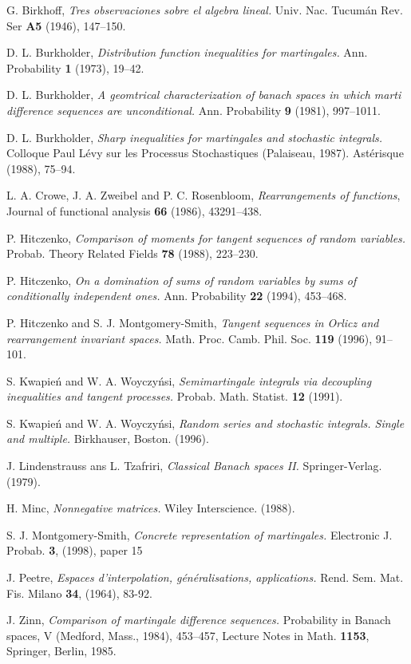 \documentclass[12pt]{amsart}
\begin{document}

\begin{thebibliography}{10}
 G. Birkhoff, \textit{Tres observaciones sobre el
algebra lineal.} Univ. Nac. Tucum\'{a}n Rev. Ser \textbf{A5}
(1946), 147--150.

 D. L. Burkholder, \textit{Distribution function inequalities for martingales.} Ann.
Probability \textbf{1} (1973), 19--42.

 D. L. Burkholder, \textit{A geomtrical characterization of banach spaces in which
marti difference sequences are unconditional.} Ann. Probability
\textbf{9} (1981), 997--1011.

 D. L. Burkholder, \textit{Sharp inequalities for martingales and stochastic integrals.}
Colloque Paul L\'{e}vy sur les Processus Stochastiques (Palaiseau,
1987). Ast\'{e}risque (1988), 75--94.

 L. A. Crowe, J. A. Zweibel and P. C. Rosenbloom, \textit{Rearrangements of functions},
Journal of functional analysis \textbf{66} (1986), 43291--438.

 P. Hitczenko, \textit{Comparison of moments for tangent sequences of random variables.}
Probab. Theory Related Fields \textbf{78} (1988), 223--230.

 P. Hitczenko, \textit{On a domination of sums of random variables by sums of conditionally
independent ones.} Ann. Probability \textbf{22} (1994), 453--468.

 P. Hitczenko and S. J. Montgomery-Smith, \textit{Tangent sequences in Orlicz and
rearrangement invariant spaces.} Math. Proc. Camb. Phil. Soc.
\textbf{119} (1996), 91--101.

 S. Kwapie\'n and W. A. Woyczy\'{n}si, \textit{Semimartingale integrals
via decoupling inequalities and tangent processes.} Probab. Math.
Statist. \textbf{12} (1991).

 S. Kwapie\'n and W. A. Woyczy\'{n}si, \textit{Random series and stochastic integrals. Single and
 multiple.} Birkhauser, Boston. (1996).

 J. Lindenstrauss ans L. Tzafriri,
\textit{Classical Banach spaces II.} Springer-Verlag. (1979).

 H. Minc, \textit{Nonnegative matrices.} Wiley Interscience. (1988).

 S. J. Montgomery-Smith, \textit{Concrete representation of
martingales.} Electronic J. Probab. \textbf{3}, (1998), paper 15

 J. Peetre, \textit{Espaces d'interpolation, g\'{e}n\'{e}ralisations,
applications.} Rend. Sem. Mat. Fis. Milano \textbf{34}, (1964),
83-92.

 J. Zinn, \textit{Comparison of martingale difference sequences.}
Probability in Banach spaces, V (Medford, Mass., 1984), 453--457,
Lecture Notes in Math. \textbf{1153}, Springer, Berlin, 1985.

\end{thebibliography}
\end{document}
